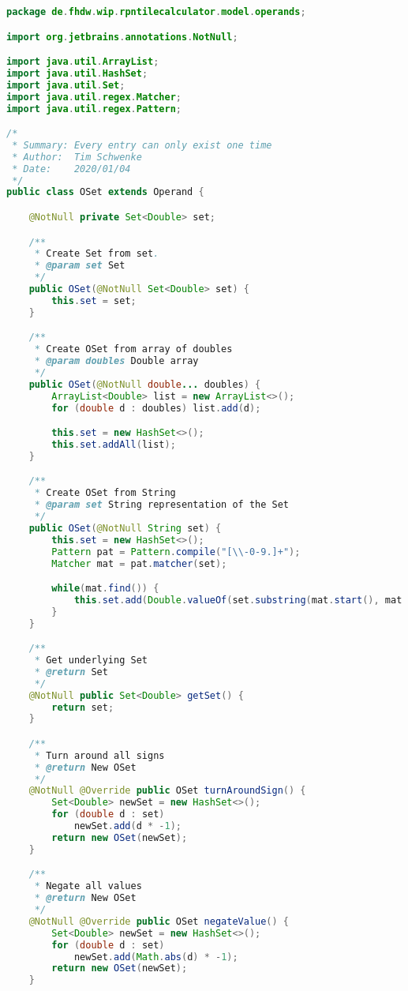 \begin{lstlisting}[caption=OSet (Schwenke),label=list:OSet,language=Java]
package de.fhdw.wip.rpntilecalculator.model.operands;

import org.jetbrains.annotations.NotNull;

import java.util.ArrayList;
import java.util.HashSet;
import java.util.Set;
import java.util.regex.Matcher;
import java.util.regex.Pattern;

/*
 * Summary: Every entry can only exist one time
 * Author:  Tim Schwenke
 * Date:    2020/01/04
 */
public class OSet extends Operand {

    @NotNull private Set<Double> set;

    /**
     * Create Set from set.
     * @param set Set
     */
    public OSet(@NotNull Set<Double> set) {
        this.set = set;
    }

    /**
     * Create OSet from array of doubles
     * @param doubles Double array
     */
    public OSet(@NotNull double... doubles) {
        ArrayList<Double> list = new ArrayList<>();
        for (double d : doubles) list.add(d);

        this.set = new HashSet<>();
        this.set.addAll(list);
    }

    /**
     * Create OSet from String
     * @param set String representation of the Set
     */
    public OSet(@NotNull String set) {
        this.set = new HashSet<>();
        Pattern pat = Pattern.compile("[\\-0-9.]+");
        Matcher mat = pat.matcher(set);

        while(mat.find()) {
            this.set.add(Double.valueOf(set.substring(mat.start(), mat.end())));
        }
    }

    /**
     * Get underlying Set
     * @return Set
     */
    @NotNull public Set<Double> getSet() {
        return set;
    }

    /**
     * Turn around all signs
     * @return New OSet
     */
    @NotNull @Override public OSet turnAroundSign() {
        Set<Double> newSet = new HashSet<>();
        for (double d : set)
            newSet.add(d * -1);
        return new OSet(newSet);
    }

    /**
     * Negate all values
     * @return New OSet
     */
    @NotNull @Override public OSet negateValue() {
        Set<Double> newSet = new HashSet<>();
        for (double d : set)
            newSet.add(Math.abs(d) * -1);
        return new OSet(newSet);
    }


\end{lstlisting}
